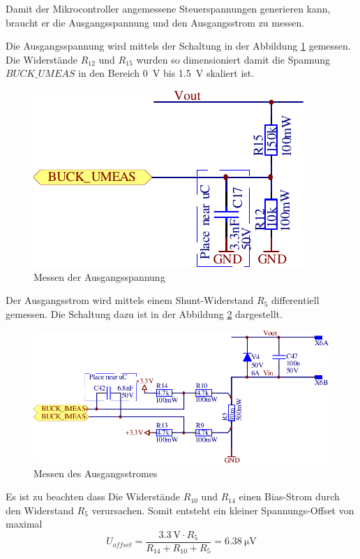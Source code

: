 Damit der Mikrocontroller angemessene Steuerspannungen  generieren kann, braucht
er die Ausgangsspannung und den Ausgangsstrom zu messen.

Die   Ausgangsspannung   wird   mittels   der   Schaltung   in   der   Abbildung
\ref{fig:circuit:buck:umeas} gemessen. Die Widerst\"ande $R_{12}$  und  $R_{15}$
wurden  so  dimensioniert  damit  die  Spannung  $BUCK\_UMEAS$  in  den  Bereich
\SI{0}{\volt} bis \SI{1.5}{\volt} skaliert ist.

\begin{figure}[th!]
    \center
    \includegraphics[width=.45\textwidth]{images/circuit/buck-umeas.pdf}
    \caption{Messen der Ausgangsspannung}
    \label{fig:circuit:buck:umeas}
\end{figure}

Der  Ausgangsstrom  wird  mittels  einem  Shunt-Widerstand  $R_5$  differentiell
gemessen.  Die  Schaltung dazu ist in der Abbildung \ref{fig:circuit:buck:imeas}
dargestellt.

\begin{figure}[th!]
    \center
    \includegraphics[width=.85\textwidth]{images/circuit/buck-imeas.pdf}
    \caption{Messen des Ausgangsstromes}
    \label{fig:circuit:buck:imeas}
\end{figure}

Es ist zu beachten dass Die Widerst\"ande $R_{10}$ und $R_{14}$ einen Bias-Strom
durch   den   Widerstand   $R_5$  verursachen.  Somit   entsteht   ein   kleiner
Spannungs-Offset von maximal
\begin{equation}
    U_{offset} = \frac{ \SI{3.3}{\volt} \cdot R_5 }{ R_{14} + R_{10} + R_5 } = \SI{6.38}{\micro\volt}
\end{equation}

